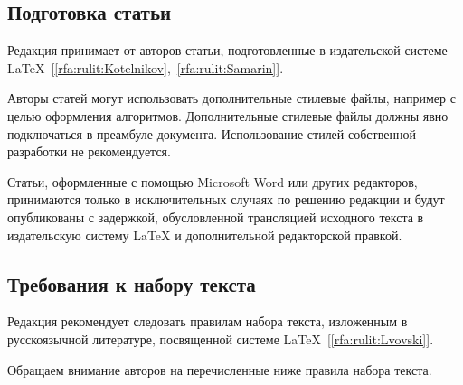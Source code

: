\documentclass[10pt,a4paper]{book}
\begin{document}
\subsection{Подготовка статьи}
Редакция принимает от авторов статьи, подготовленные в издательской системе
\LaTeX~[\ref{rfa:rulit:Kotelnikov},~\ref{rfa:rulit:Samarin}]. 

Авторы статей могут использовать дополнительные стилевые файлы, например
с целью оформления алгоритмов. Дополнительные стилевые файлы
должны явно подключаться в преамбуле документа. Использование стилей собственной
разработки не рекомендуется.

Статьи, оформленные с помощью Microsoft Word или других редакторов, принимаются только
в исключительных случаях по решению редакции и будут опубликованы
с задержкой, обусловленной трансляцией исходного текста в издательскую систему \LaTeX{} 
и дополнительной редакторской правкой.

\subsection{Требования к набору текста}
Редакция рекомендует следовать правилам набора текста, изложенным в русскоязычной
литературе, посвященной системе \LaTeX~[\ref{rfa:rulit:Lvovski}].

Обращаем внимание авторов на перечисленные ниже правила
набора текста. 
\end{document}
